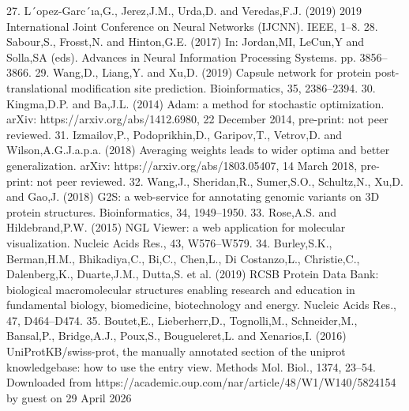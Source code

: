 27. L´opez-Garc´ıa,G., Jerez,J.M., Urda,D. and Veredas,F.J. (2019) 2019
International Joint Conference on Neural Networks (IJCNN). IEEE,
1–8.
28. Sabour,S., Frosst,N. and Hinton,G.E. (2017) In: Jordan,MI,
LeCun,Y and Solla,SA (eds). Advances in Neural Information
Processing Systems. pp. 3856–3866.
29. Wang,D., Liang,Y. and Xu,D. (2019) Capsule network for protein
post-translational modification site prediction. Bioinformatics, 35,
2386–2394.
30. Kingma,D.P. and Ba,J.L. (2014) Adam: a method for stochastic
optimization. arXiv: https://arxiv.org/abs/1412.6980, 22 December
2014, pre-print: not peer reviewed.
31. Izmailov,P., Podoprikhin,D., Garipov,T., Vetrov,D. and
Wilson,A.G.J.a.p.a. (2018) Averaging weights leads to wider optima
and better generalization. arXiv: https://arxiv.org/abs/1803.05407, 14
March 2018, pre-print: not peer reviewed.
32. Wang,J., Sheridan,R., Sumer,S.O., Schultz,N., Xu,D. and Gao,J.
(2018) G2S: a web-service for annotating genomic variants on 3D
protein structures. Bioinformatics, 34, 1949–1950.
33. Rose,A.S. and Hildebrand,P.W. (2015) NGL Viewer: a web
application for molecular visualization. Nucleic Acids Res., 43,
W576–W579.
34. Burley,S.K., Berman,H.M., Bhikadiya,C., Bi,C., Chen,L., Di
Costanzo,L., Christie,C., Dalenberg,K., Duarte,J.M., Dutta,S. et al.
(2019) RCSB Protein Data Bank: biological macromolecular
structures enabling research and education in fundamental biology,
biomedicine, biotechnology and energy. Nucleic Acids Res., 47,
D464–D474.
35. Boutet,E., Lieberherr,D., Tognolli,M., Schneider,M., Bansal,P.,
Bridge,A.J., Poux,S., Bougueleret,L. and Xenarios,I. (2016)
UniProtKB/swiss-prot, the manually annotated section of the
uniprot knowledgebase: how to use the entry view. Methods Mol.
Biol., 1374, 23–54.
Downloaded from https://academic.oup.com/nar/article/48/W1/W140/5824154 by guest on 29 April 2026

